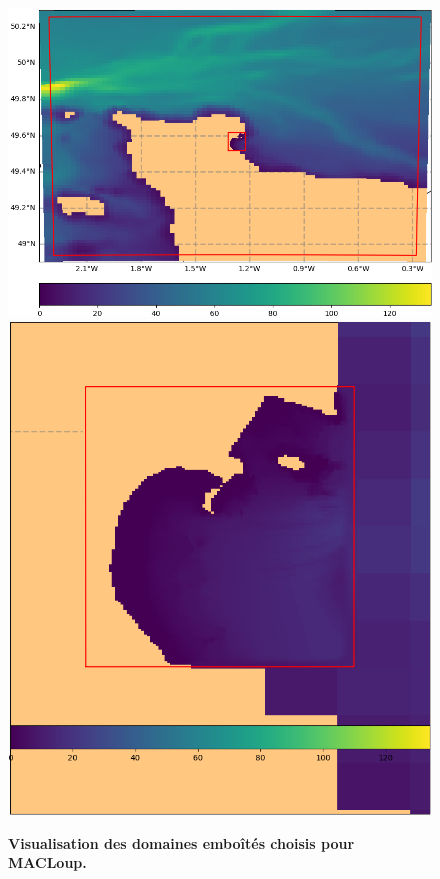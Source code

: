 \documentclass[10pt,a4paper,titlepage]{article}
\begin{document}
    
    \begin{figure}[h!]
        \centering
        \includegraphics[scale=0.4]{../images/COTENTIN_ADCL5.png}
        \includegraphics[scale=0.27]{../images/ADCL5.png}
        \caption{
            \textbf{Visualisation des domaines emboîtés choisis pour MACLoup.}\\
}
\end{figure}
\end{document}

